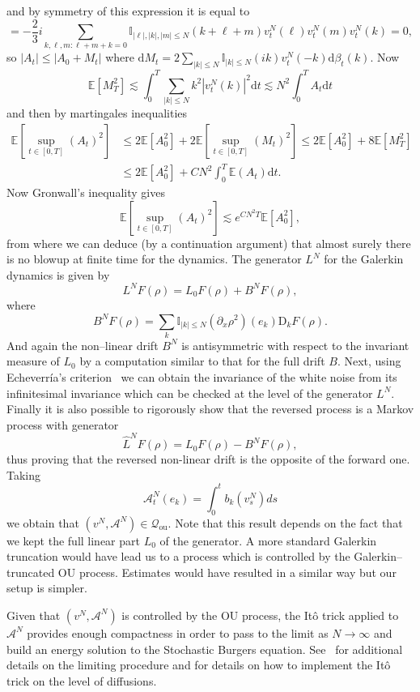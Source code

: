 \documentclass[a4paper,11pt]{article}
\newcommand{\mathD}{\mathrm{D}}
\newcommand{\mathd}{\mathrm{d}}
\newcommand{\tmop}[1]{\ensuremath{\operatorname{#1}}}
\begin{document}
and by symmetry of this expression it is equal to
\[ = - \frac{2}{3}  i  \sum_{k, \ell, m : \ell + m + k = 0} \mathbb{I}_{|
   \ell |, | k |, | m | \leqslant N}  (k + \ell + m) v^N_t (\ell) v^N_t (m)
   v^N_t (k) = 0, \]
so $|A_t| \le |A_0 + M_t|$ where $\mathd M_t = 2 \sum_{| k | \leqslant N}
\mathbb{I}_{| k | \leqslant N} ( i  k) v^N_t (- k) \mathd \beta_t (k)$. Now
\[ \mathbb{E} [M_T^2] \lesssim \int_0^T \sum_{| k | \leqslant N} k^2 | v^N_t
   (k) |^2 \mathd t \lesssim N^2 \int_0^T A_t \mathd t \]
and then by martingales inequalities
\begin{align*}
   \mathbb{E} [\sup_{t \in [0, T]} (A_t)^2] & \leqslant 2\mathbb{E} [A_0^2] + 2\mathbb{E} [\sup_{t \in [0, T]} (M_t)^2] \leqslant 2\mathbb{E} [A_0^2]^{} + 8\mathbb{E} [M_T^2]^{} \\
    & \leqslant 2\mathbb{E} [A_0^2]^{} + CN^2 \int_0^T \mathbb{E} (A_t) \mathd t.
\end{align*}
Now Gronwall's inequality gives
\[ \mathbb{E} [\sup_{t \in [0, T]} (A_t)^2] \lesssim e^{CN^2 T} \mathbb{E}
   [A_0^2], \]
from where we can deduce (by a continuation argument) that almost surely there
is no blowup at finite time for the dynamics. The generator $L^N$ for the Galerkin dynamics is given by
\[ L^N F (\rho) = L_0 F (\rho) + B^N F (\rho), \]
where
\[ B^N F (\rho) = \sum_k  \mathbb{I}_{ | k | \leqslant N} (\partial_x \rho^2) (e_k) \mathD_k F (\rho) . \]
And again the non--linear  drift $B^N$ is antisymmetric with respect to the
invariant measure of $L_0$ by a computation similar to that for the full drift $B$. Next, using Echeverr\'ia's criterion~\cite{Echeverria1982} we can obtain the invariance of the white noise from its infinitesimal invariance which can be checked at the level of the generator $L^N$. 
Finally it is also possible to 
rigorously show that the reversed process is a Markov process with generator
\[ \hat L^N F (\rho) = L_0 F (\rho) - B^N F (\rho), \]
thus proving that the reversed non-linear drift is the opposite of the forward one. Taking
$$
\mathcal{A}^N_t(e_k) = \int_0^t b_k(v^N_s) ds
$$
we obtain that $(v^N, \mathcal{A}^N)\in \mathcal{Q}_{\tmop{ou}}$. Note that this result depends on the fact that we kept the full linear part $L_0$ of the generator. A more standard Galerkin truncation would have lead us to a process which is controlled by the Galerkin--truncated OU process. Estimates would have resulted in a similar way but our setup is simpler. 

Given that $(v^N, \mathcal{A}^N)$ is controlled by the OU process, the It{\^o} trick applied to $\mathcal{A}^N$ provides enough compactness in order to pass to the
limit as $N\to\infty$ and build an energy solution to the Stochastic Burgers equation. See~\cite{gubinelli_regularization_2013} for additional details on the limiting procedure and \cite{Russo2001} for details on how to implement the It\^o trick on the level of diffusions.
\end{document}
